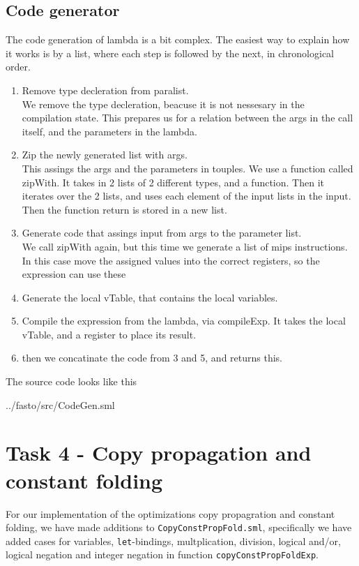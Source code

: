 \documentclass[11pt]{article}
\begin{document}
\subsection{Code generator}
The code generation of lambda is a bit complex. The easiest way to explain how it works
is by a list, where each step is followed by the next, in chronological order.
\begin{enumerate}
  \item Remove type decleration from paralist.\\
  We remove the type decleration, beacuse it is not nessesary in the compilation state. This
  prepares us for a relation between the args in the call itself, and the parameters in the
  lambda.
  \item Zip the newly generated list with args.\\
  This assings the args and the parameters in touples. We use a function called zipWith.
  It takes in 2 lists of 2 different types, and a function. Then it iterates over the 2 lists,
  and uses each element of the input lists in the input. Then the function return is stored in
  a new list.
  \item Generate code that assings input from args to the parameter list.\\
  We call zipWith again, but this time we generate a list of mips instructions. In this case
  move the assigned values into the correct registers, so the expression can use these
  \item Generate the local vTable, that contains the local variables.
  \item Compile the expression from the lambda, via compileExp. It takes the local vTable,
  and a register to place its result.
  \item then we concatinate the code from 3 and 5, and returns this.
\end{enumerate}
The source code looks like this

{../fasto/src/CodeGen.sml}



    \section{Task 4 - Copy propagation and constant folding}
	For our implementation of the optimizations copy propagration and constant
	folding, we have made additions to \texttt{CopyConstPropFold.sml}, specifically
	we have added cases for variables, \texttt{let}-bindings, multplication,
	division, logical and/or, logical negation and integer negation in function
	\texttt{copyConstPropFoldExp}.
\end{document}
